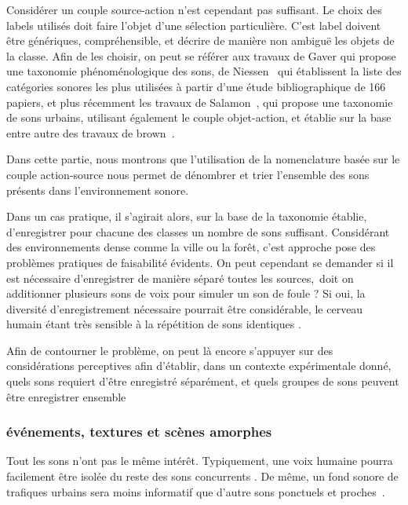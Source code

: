 Considérer un couple source-action n'est cependant pas suffisant. Le choix des labels utilisés doit faire l'objet d'une sélection particulière. C'est label doivent être génériques, compréhensible, et décrire de manière non ambiguë les objets de la classe. Afin de les choisir, on peut se référer aux travaux de Gaver \citep{gaver1993world} qui propose une taxonomie phénoménologique des sons, de Niessen~\al \citep{niessen2010categories} qui établissent la liste des catégories sonores les plus utilisées à partir d'une étude bibliographique de 166 papiers, et plus récemment les travaux de Salamon~\al \citep{Salamon14}, qui propose une taxonomie de sons urbains, utilisant également le couple objet-action, et établie sur la base entre autre des travaux de brown~\al \citep{brown2011towards}.

Dans cette partie, nous montrons que  l'utilisation de la nomenclature basée sur le couple action-source nous permet de dénombrer et trier l'ensemble des sons présents dans l'environnement sonore.

Dans un cas pratique, il s'agirait alors, sur la base de la taxonomie établie, d'enregistrer pour chacune des classes  un nombre de sons suffisant. Considérant des environnements dense comme la ville ou la forêt, c'est approche pose des problèmes pratiques de faisabilité évidents. On peut cependant se demander si il est nécessaire d'enregistrer de manière séparé toutes les sources,\eg~doit on additionner plusieurs sons de voix pour simuler un son de foule ? Si oui, la diversité d'enregistrement nécessaire pourrait être considérable, le cerveau humain étant très sensible à la répétition de sons identiques \citep{agus2010rapid}.

Afin de contourner le problème, on peut là encore s’appuyer sur des considérations perceptives afin d'établir, dans un contexte expérimentale donné, quels sons requiert d'être enregistré séparément, et quels groupes de sons peuvent être enregistrer ensemble

\subsubsection{événements, textures et scènes amorphes}

Tout les sons n'ont pas le même intérêt. Typiquement, une voix humaine pourra facilement être isolée du reste des sons concurrents \citep{carlyon2004brain}. De même, un fond sonore de trafiques urbains sera moins informatif que d'autre sons ponctuels et proches~\citep{southworth1969sonic}.


